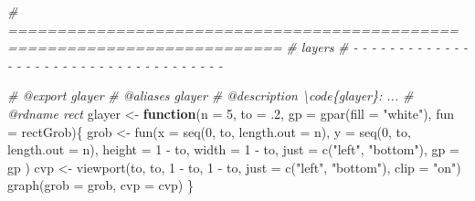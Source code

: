 \documentclass[
]{article}
\newenvironment{Shaded}{\begin{snugshade}}{\end{snugshade}}
\newcommand{\AttributeTok}[1]{\textcolor[rgb]{0.77,0.63,0.00}{#1}}
\newcommand{\CommentTok}[1]{\textcolor[rgb]{0.56,0.35,0.01}{\textit{#1}}}
\newcommand{\ControlFlowTok}[1]{\textcolor[rgb]{0.13,0.29,0.53}{\textbf{#1}}}
\newcommand{\DecValTok}[1]{\textcolor[rgb]{0.00,0.00,0.81}{#1}}
\newcommand{\FunctionTok}[1]{\textcolor[rgb]{0.00,0.00,0.00}{#1}}
\newcommand{\NormalTok}[1]{#1}
\newcommand{\OtherTok}[1]{\textcolor[rgb]{0.56,0.35,0.01}{#1}}
\newcommand{\SpecialCharTok}[1]{\textcolor[rgb]{0.00,0.00,0.00}{#1}}
\newcommand{\StringTok}[1]{\textcolor[rgb]{0.31,0.60,0.02}{#1}}
\begin{document}
\begin{Shaded}
\begin{Highlighting}[]
\CommentTok{\# ==========================================================================}
\CommentTok{\# layers}
\CommentTok{\# {-} {-} {-} {-} {-} {-} {-} {-} {-} {-} {-} {-} {-} {-} {-} {-} {-} {-} {-} {-} {-} {-} {-} {-} {-} {-} {-} {-} {-} {-} {-} {-} {-} {-} {-} {-} {-}}

\CommentTok{\#\textquotesingle{} @export glayer}
\CommentTok{\#\textquotesingle{} @aliases glayer}
\CommentTok{\#\textquotesingle{} @description \textbackslash{}code\{glayer\}: ...}
\CommentTok{\#\textquotesingle{} @rdname rect}
\NormalTok{glayer }\OtherTok{\textless{}{-}} 
  \ControlFlowTok{function}\NormalTok{(}\AttributeTok{n =} \DecValTok{5}\NormalTok{, }\AttributeTok{to =}\NormalTok{ .}\DecValTok{2}\NormalTok{, }\AttributeTok{gp =} \FunctionTok{gpar}\NormalTok{(}\AttributeTok{fill =} \StringTok{"white"}\NormalTok{), }\AttributeTok{fun =}\NormalTok{ rectGrob)\{}
\NormalTok{    grob }\OtherTok{\textless{}{-}} \FunctionTok{fun}\NormalTok{(}\AttributeTok{x =} \FunctionTok{seq}\NormalTok{(}\DecValTok{0}\NormalTok{, to, }\AttributeTok{length.out =}\NormalTok{ n),}
      \AttributeTok{y =} \FunctionTok{seq}\NormalTok{(}\DecValTok{0}\NormalTok{, to, }\AttributeTok{length.out =}\NormalTok{ n),}
      \AttributeTok{height =} \DecValTok{1} \SpecialCharTok{{-}}\NormalTok{ to,}
      \AttributeTok{width =} \DecValTok{1} \SpecialCharTok{{-}}\NormalTok{ to,}
      \AttributeTok{just =} \FunctionTok{c}\NormalTok{(}\StringTok{"left"}\NormalTok{, }\StringTok{"bottom"}\NormalTok{),}
      \AttributeTok{gp =}\NormalTok{ gp}
\NormalTok{    )}
\NormalTok{    cvp }\OtherTok{\textless{}{-}} \FunctionTok{viewport}\NormalTok{(to, to, }\DecValTok{1} \SpecialCharTok{{-}}\NormalTok{ to, }\DecValTok{1} \SpecialCharTok{{-}}\NormalTok{ to, }\AttributeTok{just =} \FunctionTok{c}\NormalTok{(}\StringTok{"left"}\NormalTok{, }\StringTok{"bottom"}\NormalTok{), }\AttributeTok{clip =} \StringTok{"on"}\NormalTok{)}
    \FunctionTok{graph}\NormalTok{(}\AttributeTok{grob =}\NormalTok{ grob, }\AttributeTok{cvp =}\NormalTok{ cvp)}
\NormalTok{  \}}
\end{Highlighting}
\end{Shaded}
\end{document}

